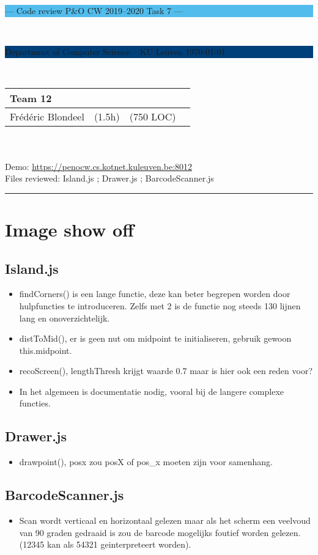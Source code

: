 \documentclass[a4paper,11pt]{article}
\begin{document}
\noindent
\colorbox[HTML]{52BDEC}{\bfseries\parbox{\textwidth}{\centering\large
  --- Code review P\&O CW 2019--2020 Task 7 ---
}}
\\[-1mm]
\colorbox[HTML]{00407A}{\bfseries\color{white}\parbox{\textwidth}{
  Department of Computer Science -- KU Leuven
  \hfill
  \today
}}
\\

\smallskip

\noindent
\begin{tabular}{*4l}
\toprule
\multicolumn{3}{l}{\large\textbf{Team 12}} \\
\midrule
Frédéric Blondeel & (1.5h) &  (750 LOC) \\ %
\bottomrule
\hline
\end{tabular}\\
\\
Demo: \url{https://penocw.cs.kotnet.kuleuven.be:8012} \\
Files reviewed: Island.js ; Drawer.js ; BarcodeScanner.js

\noindent
{\color[HTML]{52BDEC} \rule{\linewidth}{1mm} }

\smallskip

\section{Image show off}
\subsection{Island.js}
\begin{itemize}
\item findCorners() is een lange functie, deze kan beter begrepen worden door hulpfuncties te introduceren. Zelfs met 2 is de functie nog steeds 130 lijnen lang en onoverzichtelijk.
\item distToMid(), er is geen nut om midpoint te initialiseren, gebruik gewoon this.midpoint.
\item recoScreen(), lengthThresh krijgt waarde 0.7 maar is hier ook een reden voor?
\item In het algemeen is documentatie nodig, vooral bij de langere complexe functies.
\end{itemize}
\subsection{Drawer.js}
\begin{itemize}
\item drawpoint(), posx zou posX of pos\_x moeten zijn voor samenhang.
\end{itemize}
\subsection{BarcodeScanner.js}
\begin{itemize}
\item Scan wordt verticaal en horizontaal gelezen maar als het scherm een veelvoud van 90 graden gedraaid is zou de barcode mogelijks foutief worden gelezen. (12345 kan als 54321 geinterpreteert worden). 
\end{itemize}
\end{document}

